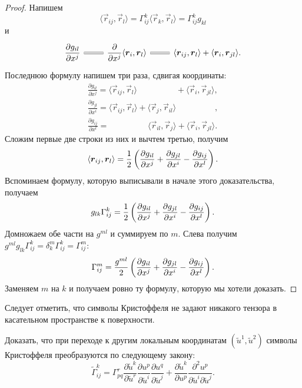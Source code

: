 \begin{proof}
	Напишем
	\[
		\langle\vec{r}_{ij}, \vec{r}_l\rangle = \Gamma_{ij}^k\langle\vec{r}_k, \vec{r}_l\rangle = \Gamma_{ij}^kg_{kl}
	\]
	и
	\[\begin{tikzcd}
		{\ds\frac{\partial g_{il}}{\partial x^j}} & {\ds\frac{\partial}{\partial x^j}\langle\vec{r}_i, \vec{r}_l\rangle} & {\langle\vec{r}_{ij}, \vec{r}_l\rangle + \langle\vec{r}_i, \vec{r}_{jl}\rangle.}
		\arrow[equals, from=1-1, to=1-2]
		\arrow[equals, from=1-2, to=1-3]
	\end{tikzcd}\]
	Последнюю формулу напишем три раза, сдвигая координаты:
	\begin{gather*}
		\frac{\partial g_{il}}{\partial x^j} = \langle\vec{r}_{ij}, \vec{r}_l\rangle \phantom{{} + \langle\vec{r}_j, \vec{r}_{il}\rangle} + \langle\vec{r}_i, \vec{r}_{jl}\rangle,\\
		\frac{\partial g_{jl}}{\partial x^i} = \langle\vec{r}_{ij}, \vec{r}_l\rangle + \langle\vec{r}_j, \vec{r}_{il}\rangle \phantom{{} + \langle\vec{r}_i, \vec{r}_{jl}\rangle},\\
		\frac{\partial g_{ij}}{\partial x^l} = \phantom{\langle\vec{r}_{ij}, \vec{r}_l\rangle + {}} \langle\vec{r}_{il}, \vec{r}_j\rangle + \langle\vec{r}_i, \vec{r}_{jl}\rangle.
	\end{gather*}
	Сложим первые две строки из них и вычтем третью, получим
	\begin{gather*}
		\langle\boldsymbol{r}_{ij}, \boldsymbol{r}_l\rangle = \frac{1}{2}\left(\frac{\partial g_{il}}{\partial x^j} + \frac{\partial g_{jl}}{\partial x^i} - \frac{\partial g_{ij}}{\partial x^l}\right).
	\end{gather*}
	Вспоминаем формулу, которую выписывали в начале этого доказательства, получаем
	\[
		g_{lk}\Gamma_{ij}^k = \frac{1}{2}\left(\frac{\partial g_{il}}{\partial x^j} + \frac{\partial g_{jl}}{\partial x^i} - \frac{\partial g_{ij}}{\partial x^l}\right).
	\]
	Домножаем обе части на $g^{ml}$ и суммируем по $m$. Слева получим $g^{ml}g_{lk}\Gamma^k_{ij} = \delta^m_k\Gamma^k_{ij} = \Gamma^m_{ij}$:
	\[
		\Gamma_{ij}^m = \frac{g^{ml}}{2}\left(\frac{\partial g_{il}}{\partial x^j} + \frac{\partial g_{jl}}{\partial x^i} - \frac{\partial g_{ij}}{\partial x^l}\right).
	\]
	Заменяем $m$ на $k$ и получаем ровно ту формулу, которую мы хотели доказать.
\end{proof}

Следует отметить, что символы Кристоффеля не задают никакого тензора в касательном пространстве к поверхности.

\begin{problem}
	Доказать, что при переходе к другим локальным координатам $(\widetilde{u}^1, \widetilde{u}^2)$ символы Кристоффеля преобразуются по следующему закону:
	\[
		\widetilde{\Gamma}_{ij}^k = \Gamma_{pq}^r\frac{\partial \widetilde{u}^k}{\partial \widetilde{u}^r}\frac{\partial u^p}{\partial \widetilde{u}^i}\frac{\partial u^q}{\partial \widetilde{u}^j} + \frac{\partial\widetilde{u}^k}{\partial u^p}\frac{\partial^2u^p}{\partial \widetilde{u}^i\partial \widetilde{u}^j}.
	\]
\end{problem}

